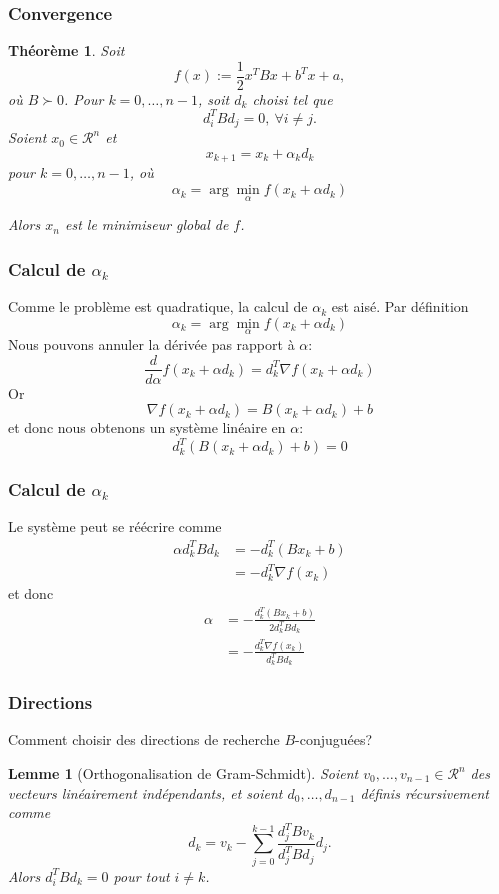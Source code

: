 \documentclass[usepdftitle=false]{beamer}
\newtheorem{lem}{Lemme}
\newtheorem{thm}{Théorème}
\def\cR{\mathcal{R}}
\begin{document}
\begin{frame}
\frametitle{Convergence}

\begin{thm}
Soit
$$
f(x) := \frac{1}{2}x^T Bx + b^T x + a,
$$
où $B \succ 0$.
Pour $k = 0,\ldots, n-1$, soit $d_k$ choisi tel que
$$
d_i^T B d_j = 0, \ \forall i \ne j.
$$
Soient $x_0 \in \cR^n$ et
$$
x_{k+1} = x_k + \alpha_k d_k
$$
pour $k = 0,\ldots, n - 1$, où
$$
\alpha_k = \arg \min_{\alpha} f(x_k + \alpha d_k)
$$

Alors $x_n$ est le minimiseur global de $f$.
\end{thm}

\end{frame}

\begin{frame}
\frametitle{Calcul de $\alpha_k$}

Comme le problème est quadratique, la calcul de $\alpha_k$ est aisé.
Par définition
$$
\alpha_k = \arg \min_{\alpha} f(x_k + \alpha d_k)
$$
Nous pouvons annuler la dérivée pas rapport à $\alpha$:
$$
\frac{d}{d \alpha} f(x_k + \alpha d_k)
= d_k^T \nabla f(x_k + \alpha d_k)
$$
Or
$$
\nabla f(x_k + \alpha d_k) = B(x_k + \alpha d_k) + b
$$
et donc nous obtenons un système linéaire en $\alpha$:
$$
d_k^T(B(x_k + \alpha d_k) + b) = 0
$$

\end{frame}

\begin{frame}
\frametitle{Calcul de $\alpha_k$}

Le système peut se réécrire comme
\begin{align*}
\alpha d_k^T B d_k &= - d_k^T(Bx_k + b) \\
& = - d_k^T \nabla f(x_k)
\end{align*}
et donc
\begin{align*}
\alpha &= - \frac{d_k^T(Bx_k + b)}{2d_k^T B d_k} \\
& = - \frac{d_k^T \nabla f(x_k)}{d_k^T B d_k}
\end{align*}

\end{frame}

\begin{frame}
\frametitle{Directions}

Comment choisir des directions de recherche $B$-conjuguées?

\begin{lem}[Orthogonalisation de Gram-Schmidt]
Soient $v_0,\ldots, v_{n-1} \in \cR^n$ des vecteurs linéairement indépendants, et soient $d_0,\ldots, d_{n-1}$ définis récursivement comme
$$
d_k = v_k - \sum_{j = 0}^{k-1} \frac{d_j^TBv_k}{d_j^TBd_j}d_j.
$$
Alors $d_i^T B d_k = 0$ pour tout $i \ne k$.
\end{lem}

\end{frame}
\end{document}
